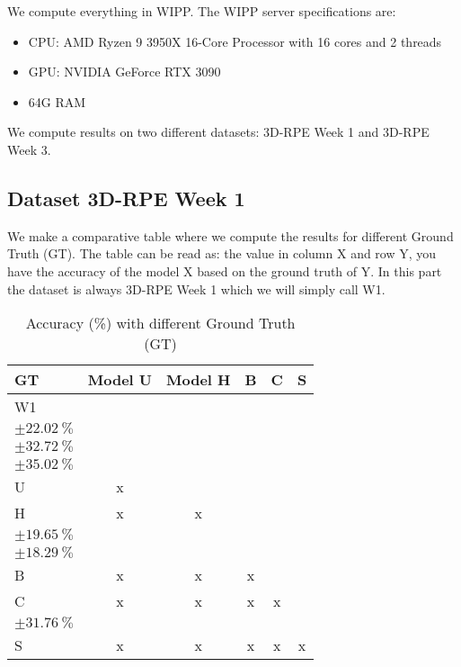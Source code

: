 We compute everything in WIPP. The WIPP server specifications are:
\begin{itemize}
  \item CPU: AMD Ryzen 9 3950X 16-Core Processor with 16 cores and 2 threads
  \item GPU: NVIDIA GeForce RTX 3090
  \item 64G RAM
\end{itemize}

We compute results on two different datasets: 3D-RPE Week 1 and 3D-RPE Week 3.

\subsection{Dataset 3D-RPE Week 1}


We make a comparative table where we compute the results for different Ground
Truth (GT). The table can be read as: the value in column X and row Y, you have
the accuracy of the model X based on the ground truth of Y. In this part the
dataset is always 3D-RPE Week 1 which we will simply call W1.

\begin{table}[H]
\small
\centering
\caption{\label{tab:base3dRPEdatamask}%
  Accuracy (\%) with different Ground Truth (GT)
}
\begin{tabular}{lccccc}
  \toprule
  GT & Model U & Model H & B & C & S \\
  \midrule
  W1 &  & \makecell{$\SI{25.05}{\percent}$ \\ $\pm \SI{22.02}{\percent}$} &  & \makecell{$\SI{50.78}{\percent}$ \\ $\pm \SI{32.72}{\percent}$}  & \makecell{$\SI{38.16}{\percent}$ \\ $\pm \SI{35.02}{\percent}$} \\
  U & x &  &  &  &  \\
  H & x & x &  & \makecell{$\SI{41.98}{\percent}$ \\ $\pm \SI{19.65}{\percent}$} & \makecell{$\SI{82.51}{\percent}$ \\ $\pm \SI{18.29}{\percent}$} \\
  B & x & x & x &  &  \\
  C & x & x & x & x & \makecell{$\SI{54.47}{\percent}$ \\ $\pm \SI{31.76}{\percent}$} \\
  S & x & x & x & x & x \\
  \bottomrule
\end{tabular}
\end{table}


